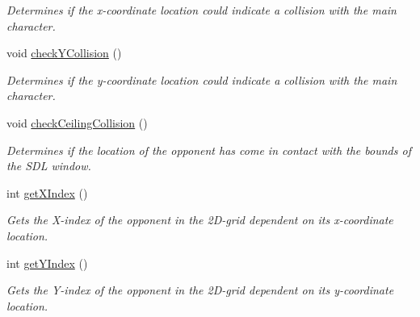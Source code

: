 \begin{DoxyCompactItemize}
\begin{DoxyCompactList}\small\item\em Determines if the x-\/coordinate location could indicate a collision with the main character. \end{DoxyCompactList}\item 
\mbox{\label{class_opponent_abd19c62a450bc94eb804e80607343e46}} 
void \mbox{\hyperlink{class_opponent_abd19c62a450bc94eb804e80607343e46}{check\+Y\+Collision}} ()
\begin{DoxyCompactList}\small\item\em Determines if the y-\/coordinate location could indicate a collision with the main character. \end{DoxyCompactList}\item 
\mbox{\label{class_opponent_a8a1561e37bf1b3f6b128604d213acbcb}} 
void \mbox{\hyperlink{class_opponent_a8a1561e37bf1b3f6b128604d213acbcb}{check\+Ceiling\+Collision}} ()
\begin{DoxyCompactList}\small\item\em Determines if the location of the opponent has come in contact with the bounds of the S\+DL window. \end{DoxyCompactList}\item 
\mbox{\label{class_opponent_ac80e4fa393e2efee2816b87ddff16c0c}} 
int \mbox{\hyperlink{class_opponent_ac80e4fa393e2efee2816b87ddff16c0c}{get\+X\+Index}} ()
\begin{DoxyCompactList}\small\item\em Gets the X-\/index of the opponent in the 2D-\/grid dependent on its x-\/coordinate location. \end{DoxyCompactList}\item 
\mbox{\label{class_opponent_a1432ead4e3f9a7d1c2b0e5f9186d6f5b}} 
int \mbox{\hyperlink{class_opponent_a1432ead4e3f9a7d1c2b0e5f9186d6f5b}{get\+Y\+Index}} ()
\begin{DoxyCompactList}\small\item\em Gets the Y-\/index of the opponent in the 2D-\/grid dependent on its y-\/coordinate location. \end{DoxyCompactList}\item 
\mbox{\label{class_opponent_a09b3060f1b6679354014834ab3bcb753}} 

\end{DoxyCompactItemize}
